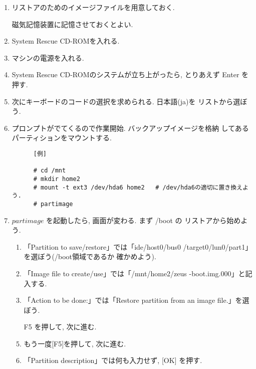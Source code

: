 \documentclass{jarticle}
\begin{document}
\begin{enumerate}
\item リストアのためのイメージファイルを用意しておく.

      磁気記憶装置に記憶させておくとよい.

\item System Rescue CD-ROMを入れる.
\item マシンの電源を入れる.
\item System Rescue CD-ROMのシステムが立ち上がったら, とりあえず
      Enter を押す.
\item 次にキーボードのコードの選択を求められる. 日本語(ja)を
      リストから選ぼう.
\item プロンプトがでてくるので作業開始. バックアップイメージを格納
      してあるパーティションをマウントする.

      \begin{verbatim}
      [例]

      # cd /mnt
      # mkdir home2
      # mount -t ext3 /dev/hda6 home2   # /dev/hda6の適切に置き換えよう.
      # partimage
      \end{verbatim}

\item $partimage$ を起動したら, 画面が変わる. まず /boot の
      リストアから始めよう.

      \begin{enumerate}
      \item 「Partition to save/restore」では「ide/host0/bus0
             /target0/lun0/part1」を選ぼう(/boot領域であるか
             確かめよう).
      \item 「Image file to create/use」では「/mnt/home2/zeus
             -boot.img.000」と記入する.
      \item 「Action to be done:」では「Restore partition from an
             image file.」を選ぼう.
      \item [F5]を押して, 次に進む.
      \item もう一度[F5]を押して, 次に進む.
      \item 「Partition description」では何も入力せず, [OK]
            を押す.
      \end{enumerate}


\end{enumerate}
\end{document}
